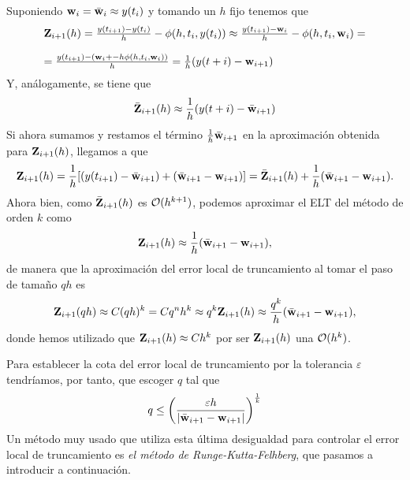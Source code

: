 Suponiendo $\vb{w}{}_i = \bar{\vb{w}{}}_i \approx y(t_i)$ y tomando un $h$ fijo tenemos que
\begin{equation*}
\begin{array}{l}
    \vb{Z}{}_{i+1}(h) = \frac{y(t_{i+1}) - y(t_i)}{h} - \phi(h, t_i, y(t_i)) \approx  \frac{y(t_{i+1}) - \vb{w}{}_i}{h} - \phi(h, t_i, \vb{w}{}_i) =\\
    \\
     =\frac{y(t_{i+1}) - (\vb{w}{}_i+ - h\phi(h, t_i, \vb{w}{}_i))}{h} = \frac{1}{h}(y(t+i)-\vb{w}{}_{i+1})
\end{array}
\end{equation*}
Y, análogamente, se tiene que 
\begin{equation*}
    \bar{\vb{Z}{}}_{i+1}(h) \approx \frac{1}{h}(y(t+i)-\bar{\vb{w}{}}_{i+1})
\end{equation*}
Si ahora sumamos y restamos el término $\frac{1}{h}\bar{\vb{w}{}}_{i+1}$
en la aproximación obtenida para $\vb{Z}{}_{i+1}(h)$,
llegamos a que
\begin{equation*}
    \vb{Z}{}_{i+1}(h) = \frac{1}{h}[(y(t_{i+1})-\bar{\vb{w}{}}_{i+1}) + (\bar{\vb{w}{}}_{i+1} - \vb{w}{}_{i+1})] = \bar{\vb{Z}{}}_{i+1}(h) + \frac{1}{h}(\bar{\vb{w}{}}_{i+1}-\vb{w}{}_{i+1}).
\end{equation*}
Ahora bien, como $\bar{\vb{Z}{}}_{i+1}(h)$ es $\vb{\mathcal{O}}{}(h^{k+1})$,
podemos aproximar el ELT del método de orden $k$ como
\begin{equation*}
\vb{Z}{}_{i+1}(h) \approx \frac{1}{h}(\bar{\vb{w}{}}_{i+1}-\vb{w}{}_{i+1}),
\end{equation*}
de manera que la aproximación del error local de truncamiento
al tomar el paso de tamaño $qh$ es
\begin{equation*}
    \vb{Z}{}_{i+1}(qh)\approx C(qh)^k = Cq^nh^k \approx q^k \vb{Z}{}_{i+1}(h) \approx \frac{q^k}{h}(\bar{\vb{w}{}}_{i+1}-\vb{w}{}_{i+1}),
\end{equation*}
donde hemos utilizado que $\vb{Z}{}_{i+1}(h) \approx Ch^k$
por ser $\vb{Z}{}_{i+1}(h)$ una $\vb{\mathcal{O}}{}(h^k)$.

Para establecer la cota del error local de truncamiento
por la tolerancia $\varepsilon$ tendríamos, por tanto,
que escoger $q$ tal que
\begin{equation*}
    q \leq \left(\frac{\varepsilon h}{|\bar{\vb{w}{}}_{i+1} - \vb{w}{}_{i+1}|}\right)^{\frac{1}{k}}
\end{equation*}
Un método muy usado que utiliza esta última desigualdad para
controlar el error local de truncamiento es
\emph{el método de Runge-Kutta-Felhberg},
que pasamos a introducir a continuación.

